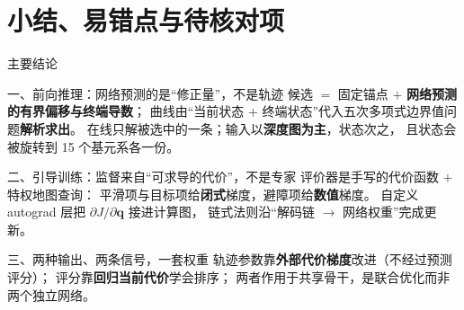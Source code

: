 
\section{小结、易错点与待核对项}

\begin{frame}{主要结论}
  \scriptsize
  \begin{block}{一、前向推理：网络预测的是“修正量”，不是轨迹}
    \scriptsize
    候选 $=$ 固定锚点 $+$ \textbf{网络预测的有界偏移与终端导数}；
    曲线由“当前状态 $+$ 终端状态”代入五次多项式边界值问题\textbf{解析求出}。
    在线只解被选中的一条；输入以\textbf{深度图为主}，状态次之，
    且状态会被旋转到 15 个基元系各一份。
  \end{block}
  \begin{block}{二、引导训练：监督来自“可求导的代价”，不是专家}
    \scriptsize
    评价器是手写的代价函数 $+$ 特权地图查询：
    平滑项与目标项给\textbf{闭式}梯度，避障项给\textbf{数值}梯度。
    自定义 autograd 层把 $\partial J/\partial\mathbf q$ 接进计算图，
    链式法则沿“解码链 $\to$ 网络权重”完成更新。
  \end{block}
  \begin{block}{三、两种输出、两条信号，一套权重}
    \scriptsize
    轨迹参数靠\textbf{外部代价梯度}改进（不经过预测评分）；
    评分靠\textbf{回归当前代价}学会排序；
    两者作用于共享骨干，是联合优化而非两个独立网络。
  \end{block}
\end{frame}

